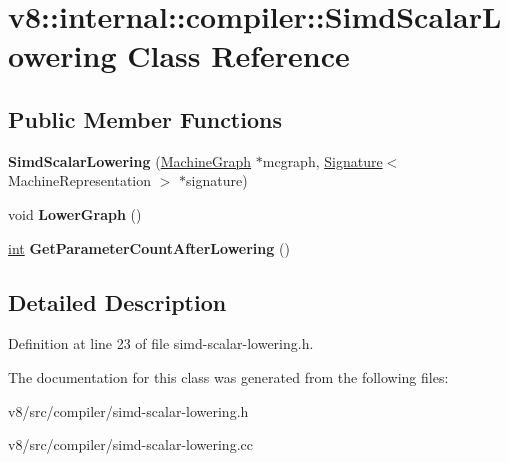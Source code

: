 \hypertarget{classv8_1_1internal_1_1compiler_1_1SimdScalarLowering}{}\section{v8\+:\+:internal\+:\+:compiler\+:\+:Simd\+Scalar\+Lowering Class Reference}
\label{classv8_1_1internal_1_1compiler_1_1SimdScalarLowering}
\subsection*{Public Member Functions}
\begin{DoxyCompactItemize}
\item 
\mbox{\label{classv8_1_1internal_1_1compiler_1_1SimdScalarLowering_a0bd4703443682e027ab2aceb39bcd9c6}} 
{\bfseries Simd\+Scalar\+Lowering} (\mbox{\hyperlink{classv8_1_1internal_1_1compiler_1_1MachineGraph}{Machine\+Graph}} $\ast$mcgraph, \mbox{\hyperlink{classv8_1_1internal_1_1Signature}{Signature}}$<$ Machine\+Representation $>$ $\ast$signature)
\item 
\mbox{\label{classv8_1_1internal_1_1compiler_1_1SimdScalarLowering_a58b07b53075959e44379e2992201cc9b}} 
void {\bfseries Lower\+Graph} ()
\item 
\mbox{\label{classv8_1_1internal_1_1compiler_1_1SimdScalarLowering_a04e21d430e861a62dab5d983f5ef5400}} 
\mbox{\hyperlink{classint}{int}} {\bfseries Get\+Parameter\+Count\+After\+Lowering} ()
\end{DoxyCompactItemize}


\subsection{Detailed Description}


Definition at line 23 of file simd-\/scalar-\/lowering.\+h.



The documentation for this class was generated from the following files\+:\begin{DoxyCompactItemize}
\item 
v8/src/compiler/simd-\/scalar-\/lowering.\+h\item 
v8/src/compiler/simd-\/scalar-\/lowering.\+cc\end{DoxyCompactItemize}

